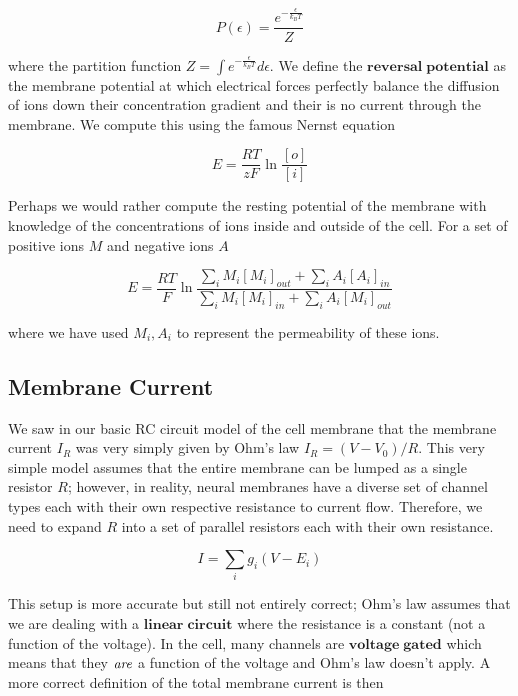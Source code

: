\documentclass[a4paper,11pt]{book}
\begin{document}
\begin{equation*}
P(\epsilon) = \frac{e^{-\frac{\epsilon}{k_{B}T}}}{Z}
\end{equation*}

where the partition function $Z= \int e^{-\frac{\epsilon}{k_{B}T}}d\epsilon$. We define the $\mathbf{reversal\; potential}$ as the membrane potential at which electrical forces perfectly balance the diffusion of ions down their concentration gradient and their is no current through the membrane. We compute this using the famous Nernst equation

\begin{equation*}
E = \frac{RT}{zF}\ln \frac{[o]}{[i]}
\end{equation*}

Perhaps we would rather compute the resting potential of the membrane with knowledge of the concentrations of ions inside and outside of the cell. For a set of positive ions $M$ and negative ions $A$

\begin{equation*}
E = \frac{RT}{F}\ln \frac{\sum_{i} M_{i}[M_{i}]_{out} + \sum_{i} A_{i}[A_{i}]_{in}}{\sum_{i} M_{i}[M_{i}]_{in} +\sum_{i} A_{i}[M_{i}]_{out}}
\end{equation*}

where we have used $M_{i}, A_{i}$ to represent the permeability of these ions.

\subsection{Membrane Current}

We saw in our basic RC circuit model of the cell membrane that the membrane current $I_{R}$ was very simply given by Ohm's law $I_{R} = (V-V_{0})/R$. This very simple model assumes that the entire membrane can be lumped as a single resistor $R$; however, in reality, neural membranes have a diverse set of channel types each with their own respective resistance to current flow. Therefore, we need to expand $R$ into a set of parallel resistors each with their own resistance.

\begin{equation*}
I = \sum_{i} g_{i}(V-E_{i})
\end{equation*}

This setup is more accurate but still not entirely correct; Ohm's law assumes that we are dealing with a $\mathbf{linear \; circuit}$ where the resistance is a constant (not a function of the voltage). In the cell, many channels are $\mathbf{voltage \; gated}$ which means that they $\it{are}$ a function of the voltage and Ohm's law doesn't apply. A more correct definition of the total membrane current is then
\end{document}
